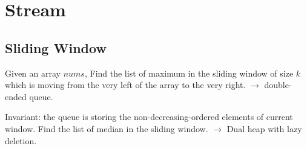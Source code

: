 \chapter{Stream}
\section{Sliding Window}
 Given an array $nums$, Find the list of maximum in the sliding window of size $k$ which is moving from the very left of the array to the very right. $\rightarrow$ double-ended queue.

Invariant: the queue is storing the non-decreasing-ordered elements of current window.
 Find the list of median in the sliding window. $\rightarrow$ Dual heap with lazy deletion.
